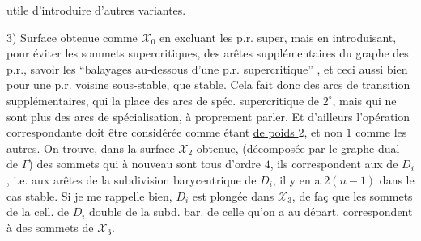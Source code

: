 utile d'introduire d'autres variantes.

3)  Surface obtenue comme $\mathcal X_0$ en excluant les p.r. super, mais en introduisant, pour éviter les sommets supercritiques, des arêtes supplémentaires du graphe \inserted{$\Gamma$} des p.r., savoir les ``balayages au-dessous d'une p.r. supercritique'' , et ceci aussi bien pour une p.r. voisine sous-stable, que stable. Cela fait donc des arcs de transition supplémentaires, qui  la place des arcs de spéc. supercritique de $2^\circ$, mais qui ne sont plus des arcs de spécialisation, à proprement parler. Et d'ailleurs l'opération correspondante doit être considérée comme étant \uline{de poids $2$}, et non $1$ comme les autres.
On trouve, dans la surface $\mathcal X_2$ obtenue,  (décomposée  par le graphe dual de $\Gamma$) des sommets qui à nouveau sont tous d'ordre $4$, ils  correspondent aux   de $D_i$ , i.e. aux arêtes de la subdivision barycentrique  de $D_i$, il y en a $2(n-1)$ dans le cas stable.
Si je me rappelle bien, $D_i$ est plongée dans $\mathcal X_3$, de faç que les sommets de la  cell. de $D_i$ double de la subd. bar. de celle qu'on a au départ,  correspondent à des sommets de $\mathcal X_3$.
